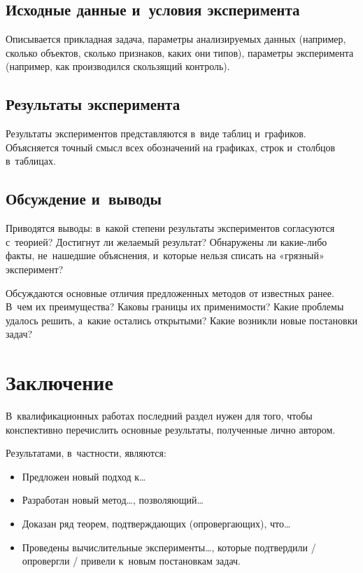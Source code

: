 \documentclass[12pt, fleqn]{article}
\begin{document}
\subsection{Исходные данные и~условия эксперимента}
Описывается прикладная задача, параметры анализируемых данных 
(например, сколько объектов, сколько признаков, каких они типов), 
параметры эксперимента 
(например, как производился скользящий контроль). 

\subsection{Результаты эксперимента}
Результаты экспериментов представляются в~виде таблиц и~графиков. 
Объясняется точный смысл всех обозначений на графиках, строк и~столбцов в~таблицах. 

\subsection{Обсуждение и~выводы}
Приводятся выводы: 
в~какой степени результаты экспериментов согласуются с~теорией? 
Достигнут ли желаемый результат? 
Обнаружены ли какие-либо факты, не~нашедшие объяснения, и~которые нельзя списать на «грязный» эксперимент?

Обсуждаются основные отличия предложенных методов от известных ранее. 
В~чем их преимущества? 
Каковы границы их применимости? 
Какие проблемы удалось решить, а~какие остались открытыми? 
Какие возникли новые постановки задач?

\section{Заключение}

В~квалификационных работах последний раздел нужен для того, чтобы 
конспективно перечислить основные результаты, полученные лично автором. 

Результатами, в~частности, являются:
\begin{itemize}
\item 
    Предложен новый подход к\dots
\item 
    Разработан новый метод\dots, позволяющий\dots
\item 
    Доказан ряд теорем, подтверждающих (опровергающих), что\dots
\item 
    Проведены вычислительные эксперименты\dots,
    которые подтвердили / опровергли / привели к~новым постановкам задач.
\end{itemize}
    
\end{document}
